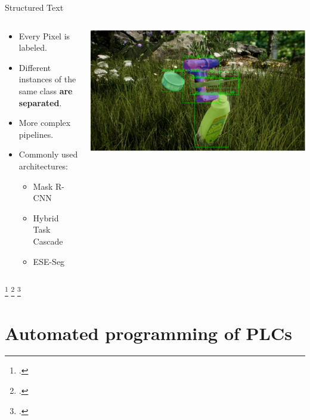 \documentclass[18pt]{beamer}
\begin{document}
\begin{frame}{Structured Text}
    \begin{columns}
        \begin{column}{0.5\textwidth}
           \begin{itemize}
               \item Every Pixel is labeled.
               \item Different instances of the same class \textbf{are separated}.
               \item More complex pipelines.
               \item Commonly used architectures:
               \begin{itemize}
                   \item Mask R-CNN~\footnotemark
                   \item Hybrid Task Cascade~\footnotemark
                   \item ESE-Seg~\footnotemark
               \end{itemize}
           \end{itemize}
        \end{column}
        \begin{column}{0.5\textwidth}
            \includegraphics[width=\textwidth]{figures/cmrcnn_mobilenet_fat.pdf}
        \end{column}
\end{columns}
\footcitetext{DBLP:journals/corr/HeGDG17}
\footcitetext{DBLP:journals/corr/abs-1901-07518}
\footcitetext{2019arXiv190804067X}
\end{frame}

\section{Automated programming of PLCs}
\end{document}
